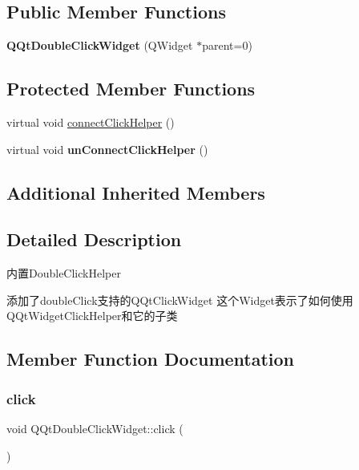 \subsection*{Public Member Functions}
\begin{DoxyCompactItemize}
\item 
\mbox{\label{class_q_qt_double_click_widget_a7e565395de0f29e5bfc8c70ddf04fdbf}} 
{\bfseries Q\+Qt\+Double\+Click\+Widget} (Q\+Widget $\ast$parent=0)
\end{DoxyCompactItemize}
\subsection*{Protected Member Functions}
\begin{DoxyCompactItemize}
\item 
virtual void \mbox{\hyperlink{class_q_qt_double_click_widget_a5518af71ca2e9a7d7d1230faeb78015d}{connect\+Click\+Helper}} ()
\item 
\mbox{\label{class_q_qt_double_click_widget_a33bc8848bc587e7ced3780b009ec0c3b}} 
virtual void {\bfseries un\+Connect\+Click\+Helper} ()
\end{DoxyCompactItemize}
\subsection*{Additional Inherited Members}


\subsection{Detailed Description}
内置\+Double\+Click\+Helper

添加了double\+Click支持的\+Q\+Qt\+Click\+Widget 这个\+Widget表示了如何使用\+Q\+Qt\+Widget\+Click\+Helper和它的子类 

\subsection{Member Function Documentation}
\mbox{\label{class_q_qt_double_click_widget_a045d2a46343284bb5f7e7d05c5187af5}} 
\subsubsection{\texorpdfstring{click}{click}}
{\footnotesize\ttfamily void Q\+Qt\+Double\+Click\+Widget\+::click (\begin{DoxyParamCaption}{ }\end{DoxyParamCaption})\hspace{0.3cm}{\ttfamily [signal]}}

